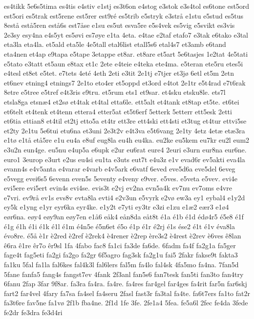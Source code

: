 {es4tikk
5e6s5tima
es4tis
e4stiv
e1stj
es3t6on
e4stog
e3stok
e3s4tol
es6tone
est5ord
est5ori
es5trak
est5rene
est5rer
est9ré
es5trib
e5stryk
e3strå
e1stu
e5stud
es5tus
8estå
estå5ren
estå6s
est7åse
e1su
es5ut
esva5re
e5s4vek
es5vig
e5svikt
es3vis
2e3sy
esy4na
e4s5yt
es5øvi
es7øye
e1ta
4eta.
e4tae
e2taf
etafo7
e3tak
e6tako
e3tal
eta3la
eta4la.
et5ald
eta5le
4e5tall
etal6list
etall5s6
etal4s7
et3amb
e6tand
eta4nen
et4ap
e9tapa
e5tape
3etappe
et8ar.
et8are
et5art
5e6tasjes
1e2tat
4e5tati
e5tato
e3tatt
et5aun
e8tax
et1c
2ete
e4teie
e4teka
ete4ma.
e5teran
ete5ru
etes5i
e4tesl
et8et
e5tet.
e7tets
4eté
4eth
2eti
e3tit
2e1tj
e7tjer
et3jø
6etl
et5m
2etn
et6nev
etning4
etnings7
2e1to
eto4er
et5oppd
et3ord
e4tot
2e1tr
e5t4rad
e7t6rak
8etre
e5tree
e5tref
e4t3ris
e9tru.
et5rum
ets1
et9sar.
et4sku
etsku8le.
ets7l
etsla8ga
etsnæ4
et2sø
et4tak
et4tal
etta6le.
ett5alt
et4tank
et8tap
et5te.
et6tei
et6telt
et4tenk
et4tenn
ettera4
etter5at
et5t6erf
5etterk
5etterr
ett5esk
2etti
et6tia
ettian8
et4til
et2tj
etto5a
et4tr
ett3re
ett4ski
ett4sti
et3tug
et4tur
ettvi5se
et2ty
2e1tu
5e6tui
etu6na
et3uni
2e3t2v
e4t3va
e5t6vang
2e1ty
4etz
4etæ
etæ3ra
e1tø
e1tå
etå5re
e1u
eu4a
e8uf
eug8la
eu4h
eu4ka.
eu2ke
eu5kem
eu7kr
eu2l
eum2
e3u2n
eun4ge.
eu5nu
e4up5a
e6upk
e2ur
eu6rat
eure4
2euri
e3urn
eur8na
eur6ne.
euro1
3europ
e3urt
e2us
eu4si
eu1ta
e3uts
eut7t
e4u3z
e1v
evad6r
ev5akti
eva4la
evann4s
e4v5anta
e4varar
e4varb
e4v5ark
e6vatf
6eved
eve5d6a
eve5del
6eveg
e5vegg
evei6s5
6evenn
even5s
5eventy
e4veny
e9ver.
e5ves.
e5veta
e5vev.
evi4e
evi5ere
evi5ert
evin4s
evi4se.
evis3t
e2vj
ev2na
evn5a4k
ev7nu
ev7oms
e4vre
e7vri.
ev9rå
ev1s
evs8v
evta8la
evti4
e2v3un
e5vyrk
e2vø
ew3a
ey1
eybal4
e1y2d
ey5k
e1yng
e1yr
eyr6ka
eyr4ke.
e1y2t
e7yti
ey3tr
e3zi
e1zu
e1æ2
eær3
e1ø4
eør6na.
eøy4
eøy9an
eøy7en
e1å6
eåk4
eån8da
eåt8t
é1a
é1b
é1d
édø4r5
é5e8
é1f
é1g
é1h
é1i
é1k
é1l
é1m
é4n5e
é5n6et
é5o
é1p
é1r
é2rj
é1s
ése2
é1t
é1v
éva8la
évo8re.
é5å
è1r
è2red
è2ref
è2rek4
è4rener
è2rep
ère3s2
è4rest
è2rev
è6ves
ê8lan
ê6ra
ê1re
êr7o
êr9sl
1fa
4fabo
fac8
fa1ci
fa3de
fa6de.
6fadm
fa4f
fa2g1a
fa5ger
fage4t
fag5eti
fa2gi
fa2go
fa2gr
6f5agro
fag3sk
fa2g1u
fai5
2fakr
fakse9t
fakta3
fa1ku
5fal
fa1la
fal6kes
fal4k3l
fal6lers
fal5m
fa4lo
fal4sk
4fa5mo
fa4na.
7fan5d
5fane
fanfa5
fang4s
fangst7ev
4fank
2f3anl
fan5s6
fan7tesk
fan5ti
fan3to
fan4try
6fanu
2fap
3far
9f8ar.
fa3ra
fa4ra.
fa4re.
fa4res
far4gel
far4ges
fa4rit
far5n
far6skj
fart2
far4vel
4fary
fa7sa
fa4sel
fa4seru
2fasl
fast3r
fa3tal
fa4te.
fa6t7ers
fa1to
fat2r
fa3t6re
fav5ne
fa1vø
2f1b
fba4ne.
2f1d
1fe
3fe.
2fe1a4
5fea.
fe5a6l
2fec
fe4da
3fede
fe2dr
fe3dra
fe3d4ri
}
